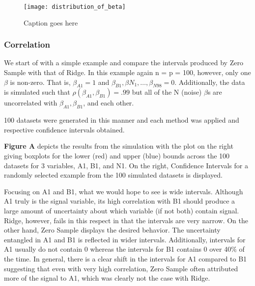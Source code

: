 \begin{figure}
  \texttt{[image: distribution\_of\_beta]}
  \caption{\label{Fig:distribution_of_beta} Caption goes here}
\end{figure}

\subsubsection{Correlation}

We start of with a simple example and compare the intervals produced by Zero Sample with that of Ridge. In this example again n = p = 100, however, only one $\beta$ is non-zero. That is, $\beta_{A1} = 1$ and $\beta_{B1}, \beta{N_1}, \ldots, \beta_{N98} = 0$. Additionally, the data is simulated such that $\rho(\beta_{A1}, \beta_{B1}) = .99$ but all of the N (noise) $\beta$s are uncorrelated with $\beta_{A1}, \beta_{B1}$, and each other.

100 datasets were generated in this manner and each method was applied and respective confidence intervals obtained.

\textbf{Figure A} depicts the results from the simulation with the plot on the right giving boxplots for the lower (red) and upper (blue) bounds across the 100 datasets for 3 variables, A1, B1, and N1. On the right, Confidence Intervals for a randomly selected example from the 100 simulated datasets is displayed.

Focusing on A1 and B1, what we would hope to see is wide intervals. Although A1 truly is the signal variable, its high correlation with B1 should produce a large amount of uncertainty about which variable (if not both) contain signal. Ridge, however, fails in this respect in that the intervals are very narrow. On the other hand, Zero Sample displays the desired behavior. The uncertainty entangled in A1 and B1 is reflected in wider intervals. Additionally, intervals for A1 usually do not contain 0 whereas the intervals for B1 contains 0 over 40\% of the time. In general, there is a clear shift in the intervals for A1 compared to B1 suggesting that even with very high correlation, Zero Sample often attributed more of the signal to A1, which was clearly not the case with Ridge.


\begin{figure}[htbp]
  \centering
\end{figure}


